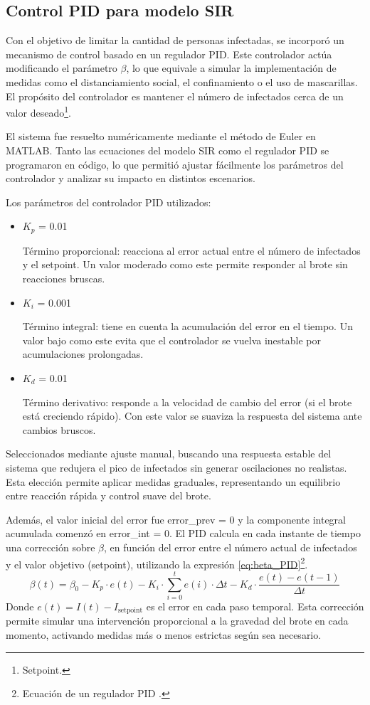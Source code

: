 \subsection{Control PID para modelo SIR}
Con el objetivo de limitar la cantidad de personas infectadas, se incorporó un mecanismo de control basado en un regulador PID. Este controlador actúa modificando el parámetro $\beta$, lo que equivale a simular la implementación de medidas como el distanciamiento social, el confinamiento o el uso de mascarillas. El propósito del controlador es mantener el número de infectados cerca de un valor deseado\footnote{Setpoint.}.

El sistema fue resuelto numéricamente mediante el método de Euler en MATLAB. Tanto las ecuaciones del modelo SIR como el regulador PID se programaron en código, lo que permitió ajustar fácilmente los parámetros del controlador y analizar su impacto en distintos escenarios.

Los parámetros del controlador PID utilizados:
\begin{itemize}
    \item $K_p$ = 0.01

    Término proporcional: reacciona al error actual entre el número de infectados y el setpoint.
    Un valor moderado como este permite responder al brote sin reacciones bruscas.
    \item $K_i$ = 0.001

    Término integral: tiene en cuenta la acumulación del error en el tiempo.
    Un valor bajo como este evita que el controlador se vuelva inestable por acumulaciones prolongadas.
    \item $K_d$ = 0.01

    Término derivativo: responde a la velocidad de cambio del error (si el brote está creciendo rápido).
Con este valor se suaviza la respuesta del sistema ante cambios bruscos.
\end{itemize}
Seleccionados mediante ajuste manual, buscando una respuesta estable del sistema que redujera el pico de infectados sin generar oscilaciones no realistas. Esta elección permite aplicar medidas graduales, representando un equilibrio entre reacción rápida y control suave del brote.

Además, el valor inicial del error fue error\_prev = 0 y la componente integral acumulada comenzó en error\_int = 0. El PID calcula en cada instante de tiempo una corrección sobre $\beta$, en función del error entre el número actual de infectados y el valor objetivo (setpoint), utilizando la expresión \eqref{eq:beta_PID}\footnote{Ecuación de un regulador PID \cite{franklin2010feedback}.}.
\begin{equation}
\beta(t) = \beta_0 - K_p \cdot e(t) - K_i \cdot \sum_{i=0}^{t} e(i) \cdot \Delta t - K_d \cdot \frac{e(t) - e(t - 1)}{\Delta t}
\label{eq:beta_PID}
\end{equation}
Donde $e(t) = I(t) - I_{\text{setpoint}}$ es el error en cada paso temporal. Esta corrección permite simular una intervención proporcional a la gravedad del brote en cada momento, activando medidas más o menos estrictas según sea necesario.

